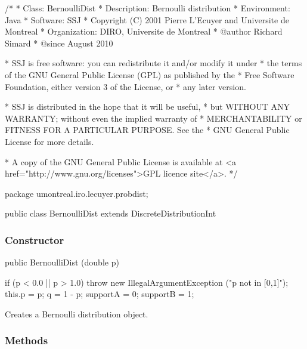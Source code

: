 \begin{code}
\begin{hide}
/*
 * Class:        BernoulliDist
 * Description:  Bernoulli distribution
 * Environment:  Java
 * Software:     SSJ 
 * Copyright (C) 2001  Pierre L'Ecuyer and Universite de Montreal
 * Organization: DIRO, Universite de Montreal
 * @author       Richard Simard
 * @since        August 2010

 * SSJ is free software: you can redistribute it and/or modify it under
 * the terms of the GNU General Public License (GPL) as published by the
 * Free Software Foundation, either version 3 of the License, or
 * any later version.

 * SSJ is distributed in the hope that it will be useful,
 * but WITHOUT ANY WARRANTY; without even the implied warranty of
 * MERCHANTABILITY or FITNESS FOR A PARTICULAR PURPOSE.  See the
 * GNU General Public License for more details.

 * A copy of the GNU General Public License is available at
   <a href="http://www.gnu.org/licenses">GPL licence site</a>.
 */
\end{hide}
package umontreal.iro.lecuyer.probdist;


public class BernoulliDist extends DiscreteDistributionInt\begin{hide} {
   private double p;
   private double q;
\end{hide}
\end{code}


\subsubsection* {Constructor}
\begin{code}

   public BernoulliDist (double p)\begin{hide} {
      if (p < 0.0 || p > 1.0)
         throw new IllegalArgumentException ("p not in [0,1]");
      this.p = p;
      q = 1 - p;
      supportA = 0;
      supportB = 1;
   }\end{hide}
\end{code}
\begin{tabb} Creates a Bernoulli distribution object.
\end{tabb}


\subsubsection* {Methods}

